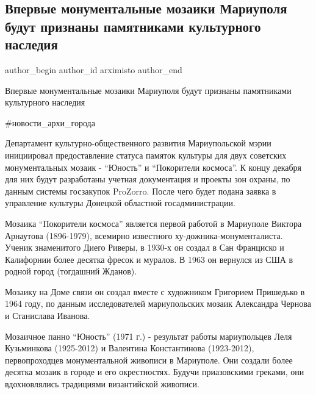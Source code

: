  
 
 
 
 

\subsection{Впервые монументальные мозаики Мариуполя будут признаны памятниками культурного наследия}
\label{sec:30_11_2021.fb.arximisto.1.monumental_mozaiki_pamjatniki_kulturn_nasledia}

\ifcmt
 author_begin
   author_id arximisto
 author_end
\fi

Впервые монументальные мозаики Мариуполя будут признаны памятниками культурного наследия

\#новости\_архи\_города

Департамент культурно-общественного развития Мариупольской мэрии инициировал
предоставление статуса памяток культуры для двух советских монументальных
мозаик - \enquote{Юность} и \enquote{Покорители космоса}. К концу декабря для них будут
разработаны учетная документация и проекты зон охраны, по данным системы
госзакупок ProZorro. После чего будет подана заявка в управление культуры
Донецкой областной госадминистрации.

Мозаика \enquote{Покорители космоса} является первой работой в Мариуполе Виктора
Арнаутова (1896-1979), всемирно известного ху\hyp{}дожника-монументалиста. Ученик
знаменитого Диего Риверы, в 1930-х он создал в Сан Франциско и Калифорнии более
десятка фресок и муралов. В 1963 он вернулся из США в родной город (тогдашний
Жданов).

Мозаику на Доме связи он создал вместе с художником Григорием Пришедько в 1964
году, по данным исследователей мариупольских мозаик Александра Чернова и
Станислава Иванова.

Мозаичное панно \enquote{Юность} (1971 г.) - результат работы мариупольцев Леля
Кузьминкова (1925-2012) и Валентина Константинова (1923-2012), первопроходцев
монументальной живописи в Мариуполе. Они создали более десятка мозаик в городе
и его окрестностях. Будучи приазовскими греками, они вдохновлялись традициями
византийской живописи.

